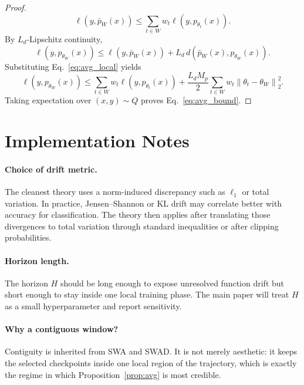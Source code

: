 \documentclass{article}
\newcommand{\swad}{\textup{\textsc{SWAD}}}
\newcommand{\norm}[1]{\left\lVert #1 \right\rVert}
\begin{document}
\begin{proof}
\begin{equation}
    \ell\!\left(y,\bar p_W(x)\right)
    \le
    \sum_{t\in W} w_t \ell\!\left(y,p_{\theta_t}(x)\right).
\end{equation}
By $L_d$-Lipschitz continuity,
\begin{equation}
    \ell\!\left(y,p_{\theta_W}(x)\right)
    \le
    \ell\!\left(y,\bar p_W(x)\right)
    +
    L_d\, d\!\left(\bar p_W(x), p_{\theta_W}(x)\right).
\end{equation}
Substituting Eq.~\eqref{eq:avg_local} yields
\begin{equation}
    \ell\!\left(y,p_{\theta_W}(x)\right)
    \le
    \sum_{t\in W} w_t \ell\!\left(y,p_{\theta_t}(x)\right)
    +
    \frac{L_d M_p}{2}
    \sum_{t\in W} w_t \norm{\theta_t-\theta_W}_2^2.
\end{equation}
Taking expectation over $(x,y)\sim Q$ proves Eq.~\eqref{eq:avg_bound}.
\end{proof}

\section{Implementation Notes}

\paragraph{Choice of drift metric.}
The cleanest theory uses a norm-induced discrepancy such as $\ell_1$ or total variation. In practice, Jensen--Shannon or KL drift may correlate better with accuracy for classification. The theory then applies after translating those divergences to total variation through standard inequalities or after clipping probabilities.

\paragraph{Horizon length.}
The horizon $H$ should be long enough to expose unresolved function drift but short enough to stay inside one local training phase. The main paper will treat $H$ as a small hyperparameter and report sensitivity.

\paragraph{Why a contiguous window?}
Contiguity is inherited from SWA and \swad{}. It is not merely aesthetic: it keeps the selected checkpoints inside one local region of the trajectory, which is exactly the regime in which Proposition~\ref{prop:avg} is most credible.
\end{document}
